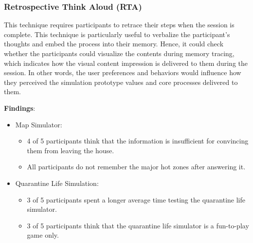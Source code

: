     \subsubsection{Retrospective Think Aloud (RTA)}
      \par This technique requires participants to retrace their steps when the session is complete. This technique
      is particularly useful to verbalize the participant's thoughts and embed the process into their memory.
      Hence, it could check whether the participants could visualize the contents during memory tracing,
      which indicates how the visual content impression is delivered to them during the session. In other
      words, the user preferences and behaviors would influence how they perceived the simulation
      prototype values and core processes delivered to them.
      \par \textbf{Findings}:
      \begin{itemize}
        \item Map Simulator:
          \begin{itemize}
            \item 4 of 5 participants think that the information is insufficient for convincing them from leaving the house.
            \item All participants do not remember the major hot zones after answering it.
          \end{itemize}
        \item Quarantine Life Simulation:
          \begin{itemize}
            \item 3 of 5 participants spent a longer average time testing the quarantine life simulator.
            \item 3 of 5 participants think that the quarantine life simulator is a fun-to-play game only.
          \end{itemize}
      \end{itemize}
    
